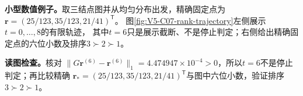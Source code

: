 \documentclass[UTF8,a4paper,11pt,openany]{ctexbook}
\begin{document}
\setcounter{page}{718}
\setcounter{chapter}{36}
\setcounter{section}{4}
\setcounter{figure}{6}
\pagestyle{headings}
\textbf{小型数值例子。}取三结点图并从均匀分布出发，精确固定点为
$\boldsymbol r=(25/123,35/123,21/41)^{\mathsf T}$。
图\ref{fig:V5-C07-rank-trajectory}左侧展示$t=0,\ldots,8$的有限轨迹，
其中$t=6$只是展示截断、不是停止判定；右侧给出精确固定点的六位小数及排序$3\succ2\succ1$。

\FloatBarrier
\noindent\textbf{读图检查。}核对
$\lVert G\boldsymbol r^{(6)}-\boldsymbol r^{(6)}\rVert_1
=4.474947\times10^{-4}>0$，所以$t=6$不是停止判定；再比较精确
$\boldsymbol r_*=(25/123,35/123,21/41)^{\mathsf T}$与图中六位小数，验证排序$3\succ2\succ1$。
\end{document}
